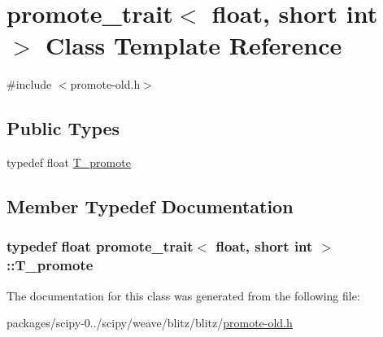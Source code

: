 \hypertarget{classpromote__trait_3_01float_00_01short_01int_01_4}{}\section{promote\+\_\+trait$<$ float, short int $>$ Class Template Reference}
\label{classpromote__trait_3_01float_00_01short_01int_01_4}


{\ttfamily \#include $<$promote-\/old.\+h$>$}

\subsection*{Public Types}
\begin{DoxyCompactItemize}
\item 
typedef float \hyperlink{classpromote__trait_3_01float_00_01short_01int_01_4_af0a05a7c696e7256e9d68ed3fc9ed938}{T\+\_\+promote}
\end{DoxyCompactItemize}


\subsection{Member Typedef Documentation}
\hypertarget{classpromote__trait_3_01float_00_01short_01int_01_4_af0a05a7c696e7256e9d68ed3fc9ed938}{}
\subsubsection[{T\+\_\+promote}]{\setlength{\rightskip}{0pt plus 5cm}typedef float {\bf promote\+\_\+trait}$<$ float, short int $>$\+::{\bf T\+\_\+promote}}\label{classpromote__trait_3_01float_00_01short_01int_01_4_af0a05a7c696e7256e9d68ed3fc9ed938}


The documentation for this class was generated from the following file\+:\begin{DoxyCompactItemize}
\item 
packages/scipy-\/0../scipy/weave/blitz/blitz/\hyperlink{promote-old_8h}{promote-\/old.\+h}\end{DoxyCompactItemize}
